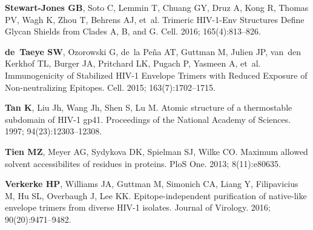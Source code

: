 \documentclass[9pt]{elife}
\begin{document}
\begin{thebibliography}{114}
\textbf{\color{eLifeMediumGrey} Stewart-Jones GB}, Soto C, Lemmin T, Chuang GY,
  Druz A, Kong R, Thomas PV, Wagh K, Zhou T, Behrens AJ, et~al.
\newblock Trimeric {HIV-1-Env} Structures Define Glycan Shields from Clades {A,
  B, and G}.
\newblock Cell.  2016; 165(4):813--826.

\textbf{\color{eLifeMediumGrey} de~Taeye SW}, Ozorowski G, de~la Pe{\~n}a AT,
  Guttman M, Julien JP, van~den Kerkhof TL, Burger JA, Pritchard LK, Pugach P,
  Yasmeen A, et~al.
\newblock Immunogenicity of Stabilized HIV-1 Envelope Trimers with Reduced
  Exposure of Non-neutralizing Epitopes.
\newblock Cell.  2015; 163(7):1702--1715.

\textbf{\color{eLifeMediumGrey} Tan K}, Liu Jh, Wang Jh, Shen S, Lu M.
\newblock Atomic structure of a thermostable subdomain of HIV-1 gp41.
\newblock Proceedings of the National Academy of Sciences.  1997;
  94(23):12303--12308.

\textbf{\color{eLifeMediumGrey} Tien MZ}, Meyer AG, Sydykova DK, Spielman SJ,
  Wilke CO.
\newblock Maximum allowed solvent accessibilites of residues in proteins.
\newblock PloS One.  2013; 8(11):e80635.

\textbf{\color{eLifeMediumGrey} Verkerke HP}, Williams JA, Guttman M, Simonich
  CA, Liang Y, Filipavicius M, Hu SL, Overbaugh J, Lee KK.
\newblock Epitope-independent purification of native-like envelope trimers from
  diverse {HIV-1} isolates.
\newblock Journal of Virology.  2016; 90(20):9471--9482.


\end{thebibliography}
\end{document}
